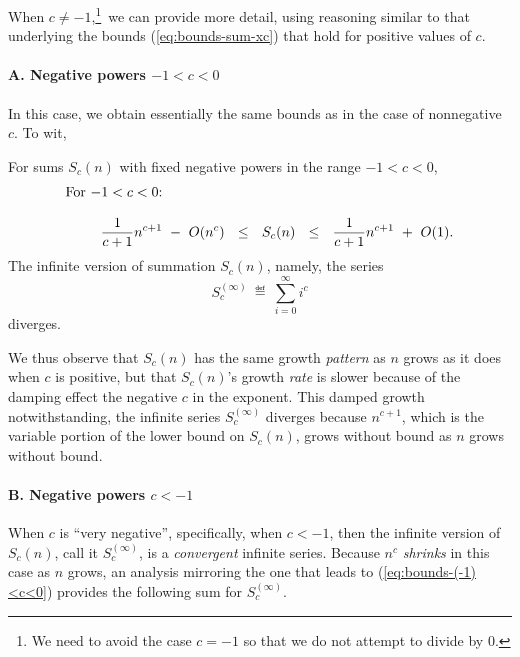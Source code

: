 When $c \neq -1$,\footnote{We need to avoid the case $c = -1$ so that
  we do not attempt to divide by $0$.}~we can provide more detail,
using reasoning similar to that underlying the bounds
(\ref{eq:bounds-sum-xc}) that hold for positive values of $c$.

\paragraph{A. Negative powers $-1 < c < 0$}

In this case, we obtain essentially the same bounds as in the case of
nonnegative $c$.  To wit,

\begin{prop}
\label{thm:bounds-(-1)<c<0}
For sums $S_c(n)$ with fixed negative powers in the range $-1 < c<0$,
\begin{equation}
\label{eq:bounds-(-1)<c<0}
\begin{array}{l}
\mbox{For $-1 < c< 0$:} \\
 \\
\hspace*{.35in}
{\displaystyle \frac{1}{c+1} n^{c+1} \ - \ O(n^c)}
  \ \ \leq \ \ S_c(n)
  \ \ \leq \ \
{\displaystyle \frac{1}{c+1} n^{c+1} \ + \ O(1)}.
\end{array}
\end{equation}
The infinite version of summation $S_c(n)$, namely, the series
\[ S_c^{(\infty)} \ \eqdef \ \sum_{i=0}^\infty i^c \]
diverges.
\end{prop}

We thus observe that $S_c(n)$ has the same growth {\em pattern} as $n$
grows as it does when $c$ is positive, but that $S_c(n)$'s growth {\em
  rate} is slower because of the damping effect the negative $c$ in
the exponent.  This damped growth notwithstanding, the infinite series
$S_c^{(\infty)}$ diverges because $n^{c+1}$, which is the variable
portion of the lower bound on $S_c(n)$, grows without bound as $n$
grows without bound.

\paragraph{B. Negative powers $c < -1$}

When $c$ is ``very negative'', specifically, when $c < -1$, then the
infinite version of $S_c(n)$, call it $S_c^{(\infty)}$, is a {\em
  convergent} infinite series.  Because $n^c$ {\em shrinks} in this
case as $n$ grows, an analysis mirroring the one that leads to
(\ref{eq:bounds-(-1)<c<0}) provides the following sum for $S_c^{(\infty)}$.

